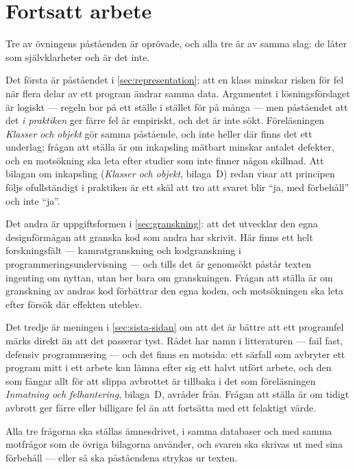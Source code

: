 \section{Fortsatt arbete}
\label{sec:ovn-fortsatt-ovning-klasser}

Tre av övningens påståenden är oprövade, och alla tre är av samma
slag: de låter som självklarheter och är det inte.

Det första är påståendet i \cref{sec:representation}: att en klass
minskar risken för fel när flera delar av ett program ändrar samma data.
Argumentet i lösningsförslaget är logiskt --- regeln bor på ett ställe i
stället för på många --- men påståendet att det \emph{i praktiken} ger
färre fel är empiriskt, och det är inte sökt.  Föreläsningen
\emph{Klasser och objekt} gör samma påstående, och inte heller där finns
det ett underlag; frågan att ställa är om inkapsling mätbart minskar
antalet defekter, och en motsökning ska leta efter studier som inte
finner någon skillnad.  Att bilagan om inkapsling
(\emph{Klasser och objekt}, bilaga~D) redan visar att principen följs
ofullständigt i praktiken är ett skäl att tro att svaret blir
\enquote{ja, med förbehåll} och inte \enquote{ja}.

Det andra är uppgiftsformen i \cref{sec:granskning}: att det utvecklar
den egna designförmågan att granska kod som andra har skrivit.  Här
finns ett helt forskningsfält --- kamratgranskning och kodgranskning i
programmeringsundervisning --- och tills det är genomsökt påstår texten
ingenting om nyttan, utan ber bara om granskningen.  Frågan att ställa
är om granskning av andras kod förbättrar den egna koden, och
motsökningen ska leta efter försök där effekten uteblev.

Det tredje är meningen i \cref{sec:sista-sidan} om att det är bättre
att ett programfel märks direkt än att det passerar tyst.  Rådet har
namn i litteraturen --- \foreignlanguage{english}{fail fast},
defensiv programmering --- och det finns en motsida: ett särfall som
avbryter ett program mitt i ett arbete kan lämna efter sig ett halvt
utfört arbete, och den som fångar allt för att slippa avbrottet är
tillbaka i det som föreläsningen \emph{Inmatning och felhantering},
bilaga~D, avråder från.  Frågan att ställa är om tidigt avbrott ger
färre eller billigare fel än att fortsätta med ett felaktigt värde.

Alla tre frågorna ska ställas ämnesdrivet, i samma databaser och med samma
motfrågor som de övriga bilagorna använder, och svaren ska skrivas ut
med sina förbehåll --- eller så ska påståendena strykas ur texten.
